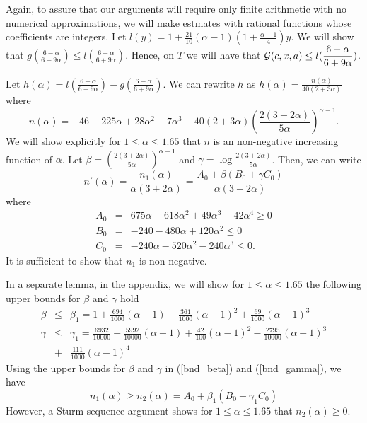 \documentclass[12pt]{article}
\newcommand{\ds}{\displaystyle}
\begin{document}
Again, to assure that our arguments will require only finite arithmetic with no numerical approximations, we will make estmates with rational functions whose coefficients are integers. Let ${\ds l(y) = 1 +\frac{21}{10}(\alpha-1)(1+\frac{\alpha-1}{4})y}$. We will show that ${\ds g(\frac{6-\alpha}{6+9\alpha}) \le l(\frac{6-\alpha}{6+9\alpha})}$.  Hence, on $T$ we will have that ${\ds {\cal G}(c,x,a) \le l(\frac{6-\alpha}{6+9\alpha}})$.

Let ${\ds h(\alpha) = l(\frac{6-\alpha}{6+9\alpha}) - g(\frac{6-\alpha}{6+9\alpha}) }$.  We can rewrite $h$ as 
${\ds h(\alpha) = \frac{n(\alpha)}{40(2+3\alpha)} }$ where
$$
n(\alpha) = -46 + 225\alpha + 28\alpha^2 - 7\alpha^3 -40(2+3\alpha)\left( \frac{2(3+2\alpha)}{5\alpha} \right)^{\alpha-1}.
$$
We will show explicitly for $1 \le \alpha \le 1.65$ that $n$ is an non-negative increasing function of $\alpha$.
Let ${\ds \beta = \left( \frac{2(3+2\alpha)}{5\alpha} \right)^{\alpha-1} }$ and ${\ds \gamma = \log \frac{2(3+2\alpha)}{5\alpha} }$.  Then, we can write
$$
n'(\alpha) = \frac{n_1(\alpha)}{\alpha(3+2\alpha)} =\frac{A_0  + \beta(B_0  +\gamma C_0)}{\alpha(3+2\alpha)}
$$
where
\begin{eqnarray*}
A_0 &=& 675\alpha + 618\alpha^2 +49\alpha^3 -42\alpha^4 \ge 0\\
B_0 &=& -240 -480\alpha+120\alpha^2 \le 0\\
C_0 &=& -240\alpha-520\alpha^2-240\alpha^3 \le 0.
\end{eqnarray*}
It is sufficient to show that $n_1$ is non-negative.

In a separate lemma, in the appendix, we will show for $1 \le \alpha \le 1.65$ the following upper bounds for $\beta$ and $\gamma$ hold
\begin{eqnarray} \label{bnd_beta}
\beta &\le& \beta_1 = 1+\frac{694}{1000}(\alpha-1)-\frac{361}{1000}(\alpha-1)^2+\frac{69}{1000}(\alpha-1)^3 \\ \label{bnd_gamma}
\gamma &\le& \gamma_1 = \frac{6932}{10000}-\frac{5992}{10000}(\alpha-1)+\frac{42}{100}(\alpha-1)^2-\frac{2795}{10000}(\alpha-1)^3 \\ \nonumber
&+&\frac{111}{1000}(\alpha-1)^4
\end{eqnarray}
Using the upper bounds for $\beta$ and $\gamma$ in (\ref{bnd_beta}) and (\ref{bnd_gamma}), we have
$$
n_1(\alpha) \ge n_2(\alpha) = A_0 + \beta_1(B_0 + \gamma_1 C_0)
$$
However, a Sturm sequence argument shows for $1 \le \alpha \le 1.65$ that $n_2(\alpha) \ge 0$.

\vspace{0.05in}
\end{document}

